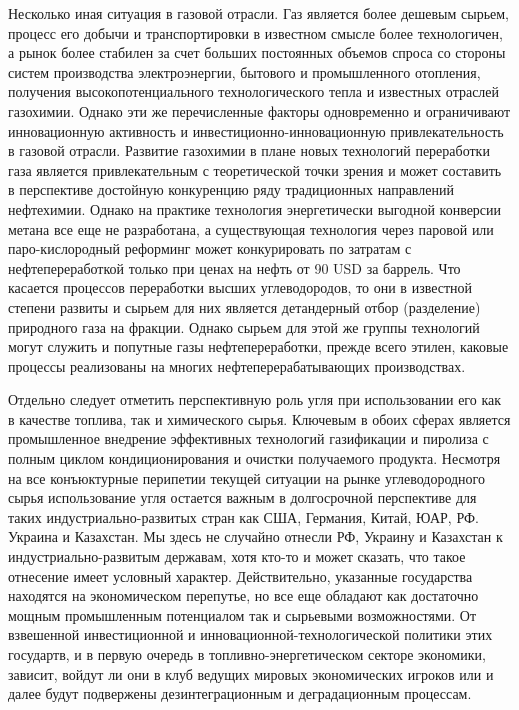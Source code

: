 Несколько иная ситуация в газовой отрасли.
Газ является более дешевым сырьем, процесс его добычи и транспортировки в известном смысле более технологичен, а рынок более стабилен за счет больших постоянных объемов спроса со стороны систем производства электроэнергии, бытового и промышленного отопления, получения высокопотенциального технологического тепла и известных отраслей газохимии.
Однако эти же перечисленные факторы одновременно и ограничивают инновационную активность и инвестиционно-инновационную привлекательность в газовой отрасли.
Развитие газохимии в плане новых технологий переработки газа является привлекательным с теоретической точки зрения и может составить в перспективе достойную конкуренцию ряду традиционных направлений нефтехимии.
Однако на практике технология энергетически выгодной конверсии метана все еще не разработана, а существующая технология через паровой или паро-кислородный реформинг может конкурировать по затратам с нефтепереработкой только при ценах на нефть от 90 USD за баррель.
Что касается процессов переработки высших углеводородов, то они в известной степени развиты и сырьем для них является детандерный отбор (разделение) природного газа на фракции.
Однако сырьем для этой же группы технологий могут служить и попутные газы нефтепереработки, прежде всего этилен, каковые процессы реализованы на многих нефтеперерабатывающих производствах.

Отдельно следует отметить перспективную роль угля при использовании его как в качестве топлива, так и химического сырья.
Ключевым в обоих сферах является промышленное внедрение эффективных технологий газификации и пиролиза с полным циклом кондиционирования и очистки получаемого продукта.
Несмотря на все конъюктурные перипетии текущей ситуации на рынке углеводородного сырья использование угля остается важным в долгосрочной перспективе для таких индустриально-развитых стран как США, Германия, Китай, ЮАР, РФ.
Украина и Казахстан.
Мы здесь не случайно отнесли РФ, Украину и Казахстан к индустриально-развитым державам, хотя кто-то и может сказать, что такое отнесение имеет условный характер.
Действительно, указанные государства находятся на экономическом перепутье, но все еще обладают как достаточно мощным промышленным потенциалом так и сырьевыми возможностями.
От взвешенной инвестиционной и инновационной-технологической политики этих государтв, и в первую очередь в топливно-энергетическом секторе экономики, зависит, войдут ли они в клуб ведущих мировых экономических игроков или и далее будут подвержены дезинтеграционным и деградационным процессам.


